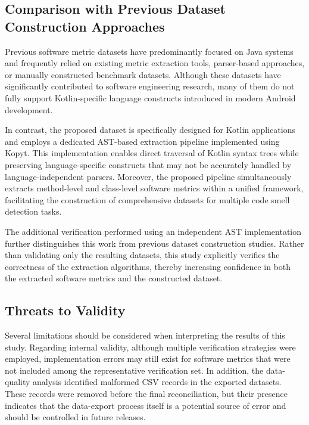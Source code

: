 \documentclass[]{einformatica}
\begin{document}
\subsection{Comparison with Previous Dataset Construction Approaches}

Previous software metric datasets have predominantly focused on Java systems and frequently relied on existing metric extraction tools, parser-based approaches, or manually constructed benchmark datasets. Although these datasets have significantly contributed to software engineering research, many of them do not fully support Kotlin-specific language constructs introduced in modern Android development.

In contrast, the proposed dataset is specifically designed for Kotlin applications and employs a dedicated AST-based extraction pipeline implemented using Kopyt. This implementation enables direct traversal of Kotlin syntax trees while preserving language-specific constructs that may not be accurately handled by language-independent parsers. Moreover, the proposed pipeline simultaneously extracts method-level and class-level software metrics within a unified framework, facilitating the construction of comprehensive datasets for multiple code smell detection tasks.

The additional verification performed using an independent AST implementation further distinguishes this work from previous dataset construction studies. Rather than validating only the resulting datasets, this study explicitly verifies the correctness of the extraction algorithms, thereby increasing confidence in both the extracted software metrics and the constructed dataset.

\subsection{Threats to Validity}

Several limitations should be considered when interpreting the results of this study. Regarding internal validity, although multiple verification strategies were employed, implementation errors may still exist for software metrics that were not included among the representative verification set. In addition, the data-quality analysis identified malformed CSV records in the exported datasets. These records were removed before the final reconciliation, but their presence indicates that the data-export process itself is a potential source of error and should be controlled in future releases.
\end{document}
